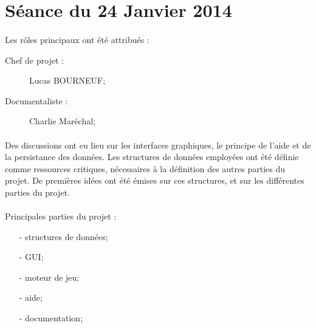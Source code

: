 
\newcommand{\titre}{Compte-rendu de séance}













\section{Séance du 24 Janvier 2014}
    	\paragraph*{}
	Les rôles principaux ont été attribués :
	\begin{description}
		\item[Chef de projet : ] Lucas BOURNEUF;
		\item[Documentaliste : ] Charlie Maréchal;
	\end{description}
    	\paragraph*{}
	Des discussions ont eu lieu sur les interfaces graphiques, le principe de l'aide et de la persistance des données.
	Les structures de données employées ont été définie comme ressources critiques, nécessaires à la définition des autres parties du projet. 
	De premières idées ont été émises sur ces structures, et sur les différentes parties du projet.
    	\paragraph*{}
	Principales parties du projet :
	\begin{itemize}
		\item[- structures de données;]
		\item[- GUI;]
		\item[- moteur de jeu;]
		\item[- aide;]
		\item[- documentation;]
	\end{itemize}
